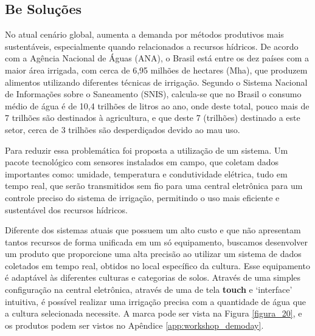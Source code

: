 \subsection{Be Soluções}

No atual cenário global, aumenta a demanda por métodos produtivos mais sustentáveis, especialmente quando relacionados a recursos hídricos. De acordo com a Agência Nacional de Águas (ANA), o Brasil está entre os dez países com a maior área irrigada, com cerca de 6,95 milhões de hectares (Mha), que produzem alimentos utilizando diferentes técnicas de irrigação. Segundo o Sistema Nacional de Informações sobre o Saneamento (SNIS), calcula-se que no Brasil o consumo médio de água é de 10,4 trilhões de litros ao ano, onde deste total, pouco mais de 7 trilhões são destinados à agricultura, e que deste 7 (trilhões) destinado a este setor, cerca de 3 trilhões são desperdiçados devido ao mau uso.

Para reduzir essa problemática foi proposta a utilização de um sistema. Um pacote tecnológico com sensores instalados em campo, que coletam dados importantes como: umidade, temperatura e condutividade elétrica, tudo em tempo real, que serão transmitidos sem fio para uma central eletrônica para um controle preciso do sistema de irrigação, permitindo o uso mais eficiente e sustentável dos recursos hídricos.

Diferente dos sistemas atuais que possuem um alto custo e que não apresentam tantos recursos de forma unificada em um só equipamento, buscamos desenvolver um produto que proporcione uma alta precisão ao utilizar um sistema de dados coletados em tempo real, obtidos no local específico da cultura. Esse equipamento é adaptável às diferentes culturas e categorias de solos. Através de uma simples configuração na central eletrônica, através de uma de tela \textbf{touch} e ‘interface’ intuitiva, é possível realizar uma irrigação precisa com a quantidade de água que a cultura selecionada necessite. A marca pode ser vista na Figura \ref{figura_20}, e os produtos podem ser vistos no Apêndice \ref{app:workshop_demoday}.

